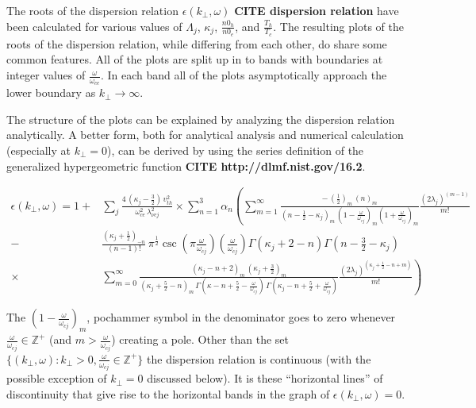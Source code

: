 \documentclass[12pt,a4paper]{article}
\begin{document}
    The roots of the dispersion relation $\epsilon(k_\perp, \omega)$ \textbf{CITE dispersion relation} have been calculated for various values of $\Lambda_j$, $\kappa_j$, $\frac{n0_h}{n0_e}$, and $\frac{T_h}{T_c}$.
    The resulting plots of the roots of the dispersion relation, while differing from each other, do share some common features.
    All of the plots are split up in to bands with boundaries at integer values of $\frac{\omega}{\omega_{ce}}$.
    In each band all of the plots asymptotically approach the lower boundary as $k_\perp \rightarrow \infty$.

    The structure of the plots can be explained by analyzing the dispersion relation analytically.
    A better form, both for analytical analysis and numerical calculation (especially at $k_\perp = 0$), can be derived by using the series definition of the generalized hypergeometric function \textbf{CITE http://dlmf.nist.gov/16.2}.

    \begin{align}
        \nonumber \epsilon(k_\perp, \omega) = 1 +& \sum_j \frac{4 \, (\kappa_j - \frac{3}{2}) \, v^2_{th}}{\omega^2_{ce} \, \lambda^2_{\nu c j}} \times \sum_{n = 1}^3 \alpha_n \left( \sum_{m = 1}^\infty \frac{ -\, (\frac{1}{2})_m \, (n)_m }{(n - \frac{1}{2} - \kappa_j)_m \, (1 - \frac{\omega}{\omega_{cj}})_m (1 + \frac{\omega}{\omega_{cj}})_m } \frac{(2 \lambda_j)^{(m - 1)}}{m!} \right. \\
        \nonumber -& \left. \frac{(\kappa_j + \frac{1}{2})_{-n}}{(n - 1)!} \, \pi^{\frac{1}{2}} \csc\left(\pi \frac{\omega}{\omega_{cj}}\right) \left(\frac{\omega}{\omega_{cj}}\right) \Gamma(\kappa_j + 2 - n) \Gamma(n - \frac{3}{2} - \kappa_j) \right.\\
        \times& \left. \sum_{m = 0}^\infty \frac{(\kappa_j - n + 2)_m \, (\kappa_j + \frac{3}{2})_m}{(\kappa_j + \frac{5}{2} - n)_m \, \Gamma(\kappa - n + \frac{5}{2} - \frac{\omega}{\omega_{cj}}) \, \Gamma(\kappa_j - n + \frac{5}{2} + \frac{\omega}{\omega_{cj}})} \frac{(2 \lambda_j)^{(\kappa_j + \frac{1}{2} - n + m)}}{m!} \right)
    \end{align}

    The $(1 - \frac{\omega}{\omega_{cj}})_m$, pochammer symbol in the denominator goes to zero whenever $\frac{\omega}{\omega_{cj}} \in \mathbb{Z}^+$ (and $m > \frac{\omega}{\omega_{cj}}$) creating a pole.
    Other than the set $\{(k_\perp, \omega) : k_\perp > 0, \frac{\omega}{\omega_{cj}} \in \mathbb{Z}^+\}$ the dispersion relation is continuous (with the possible exception of $k_\perp = 0$ discussed below).
    It is these ``horizontal lines'' of discontinuity that give rise to the horizontal bands in the graph of $\epsilon(k_\perp, \omega) = 0$.
\end{document}
